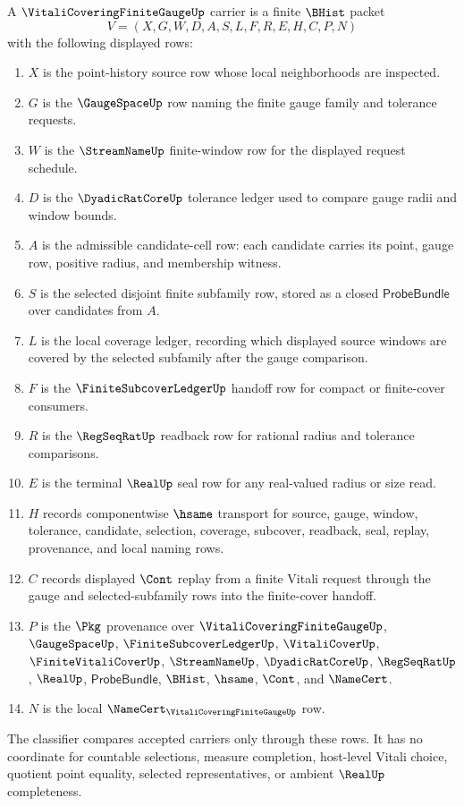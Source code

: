 \begin{definition}
\label{def:vitali-covering-finite-gauge-carrier}
A $\VitaliCoveringFiniteGaugeUp$ carrier is a finite $\BHist$ packet
$$
V=(X,G,W,D,A,S,L,F,R,E,H,C,P,N)
$$
with the following displayed rows:
\begin{enumerate}
\item $X$ is the point-history source row whose local neighborhoods are inspected.
\item $G$ is the $\GaugeSpaceUp$ row naming the finite gauge family and tolerance requests.
\item $W$ is the $\StreamNameUp$ finite-window row for the displayed request schedule.
\item $D$ is the $\DyadicRatCoreUp$ tolerance ledger used to compare gauge radii and window bounds.
\item $A$ is the admissible candidate-cell row: each candidate carries its point, gauge row, positive radius, and membership witness.
\item $S$ is the selected disjoint finite subfamily row, stored as a closed $\mathsf{ProbeBundle}$ over candidates from $A$.
\item $L$ is the local coverage ledger, recording which displayed source windows are covered by the selected subfamily after the gauge comparison.
\item $F$ is the $\FiniteSubcoverLedgerUp$ handoff row for compact or finite-cover consumers.
\item $R$ is the $\RegSeqRatUp$ readback row for rational radius and tolerance comparisons.
\item $E$ is the terminal $\RealUp$ seal row for any real-valued radius or size read.
\item $H$ records componentwise $\hsame$ transport for source, gauge, window, tolerance, candidate, selection, coverage, subcover, readback, seal, replay, provenance, and local naming rows.
\item $C$ records displayed $\Cont$ replay from a finite Vitali request through the gauge and selected-subfamily rows into the finite-cover handoff.
\item $P$ is the $\Pkg$ provenance over $\VitaliCoveringFiniteGaugeUp$, $\GaugeSpaceUp$, $\FiniteSubcoverLedgerUp$, $\VitaliCoverUp$, $\FiniteVitaliCoverUp$, $\StreamNameUp$, $\DyadicRatCoreUp$, $\RegSeqRatUp$, $\RealUp$, $\mathsf{ProbeBundle}$, $\BHist$, $\hsame$, $\Cont$, and $\NameCert$.
\item $N$ is the local $\NameCert_{\VitaliCoveringFiniteGaugeUp}$ row.
\end{enumerate}
The classifier compares accepted carriers only through these rows. It has no coordinate for countable selections, measure completion, host-level Vitali choice, quotient point equality, selected representatives, or ambient $\RealUp$ completeness.
\end{definition}

